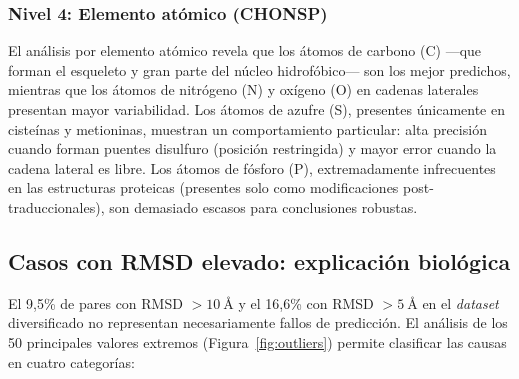 \subsubsection{Nivel 4: Elemento at\'omico (CHONSP)}

El an\'alisis por elemento at\'omico revela que los \'atomos de carbono (C) ---que
forman el esqueleto y gran parte del n\'ucleo hidrofóbico--- son los mejor predichos,
mientras que los \'atomos de nitr\'ogeno (N) y ox\'igeno (O) en cadenas laterales
presentan mayor variabilidad. Los \'atomos de azufre (S), presentes \'unicamente
en ciste\'inas y metioninas, muestran un comportamiento particular: alta precisi\'on
cuando forman puentes disulfuro (posici\'on restringida) y mayor error cuando la
cadena lateral es libre. Los \'atomos de f\'osforo (P), extremadamente infrecuentes
en las estructuras proteicas (presentes solo como modificaciones post-traduccionales),
son demasiado escasos para conclusiones robustas.

\subsection{Casos con RMSD elevado: explicaci\'on biol\'ogica}
\label{subsec:rmsd_elevado}

El 9,5\% de pares con RMSD $> \SI{10}{\angstrom}$ y el 16,6\% con RMSD $> \SI{5}{\angstrom}$
en el \textit{dataset} diversificado no representan necesariamente fallos de predicci\'on. El an\'alisis
de los 50 principales valores extremos (Figura~\ref{fig:outliers}) permite
clasificar las causas en cuatro categor\'ias:


